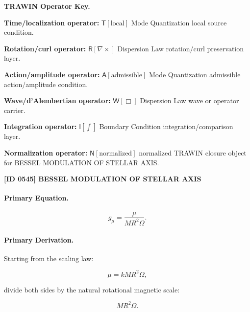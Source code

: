 \par\vspace{0.45\baselineskip}
\noindent\begin{minipage}[t]{\linewidth}
\begingroup
\small
\raggedright
\textbf{TRAWIN Operator Key.}\par
\noindent\textbf{Time/localization operator:} $\mathsf{T}\!\left[\mathrm{local}\right]$ Mode Quantization local source condition.\par
\noindent\textbf{Rotation/curl operator:} $\mathsf{R}\!\left[\nabla\times\right]$ Dispersion Law rotation/curl preservation layer.\par
\noindent\textbf{Action/amplitude operator:} $\mathsf{A}\!\left[\mathrm{admissible}\right]$ Mode Quantization admissible action/amplitude condition.\par
\noindent\textbf{Wave/d'Alembertian operator:} $\mathsf{W}\!\left[\Box\right]$ Dispersion Law wave or operator carrier.\par
\noindent\textbf{Integration operator:} $\mathsf{I}\!\left[\int\right]$ Boundary Condition integration/comparison layer.\par
\noindent\textbf{Normalization operator:} $\mathsf{N}\!\left[\mathrm{normalized}\right]$ normalized TRAWIN closure object for BESSEL MODULATION OF STELLAR AXIS.\par
\endgroup
\end{minipage}

\clearpage
\noindent\textbf{[ID 0545] BESSEL MODULATION OF STELLAR AXIS}\par
\vspace{0.35em}
\paragraph{Primary Equation.}
\begin{equation}
g_{\mu}
=
\frac{\mu}
{MR^2\Omega}.
\end{equation}

\paragraph{Primary Derivation.}
Starting from the scaling law:

\begin{equation}
\mu
=
kMR^2\Omega ,
\end{equation}

divide both sides by the natural rotational magnetic scale:

\begin{equation}
MR^2\Omega .
\end{equation}

